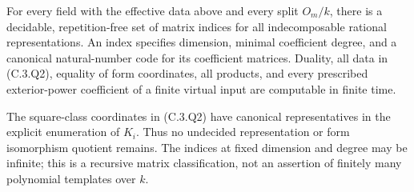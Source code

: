 \begin{theorem}
\label{C:Om_effective_C1}
For every field with the effective data above and every split $O_m/k$,
there is a decidable, repetition-free set of matrix indices for all
indecomposable rational representations. An index specifies dimension,
minimal coefficient degree, and a canonical natural-number code for
its coefficient matrices. Duality, all data in (C.3.Q2), equality of
form coordinates, all products, and every prescribed exterior-power
coefficient of a finite virtual input are computable in finite time.

The square-class coordinates in (C.3.Q2) have canonical representatives
in the explicit enumeration of $K_i$. Thus no undecided representation
or form isomorphism quotient remains. The indices at fixed dimension
and degree may be infinite; this is a recursive matrix classification,
not an assertion of finitely many polynomial templates over $k$.
\end{theorem}
